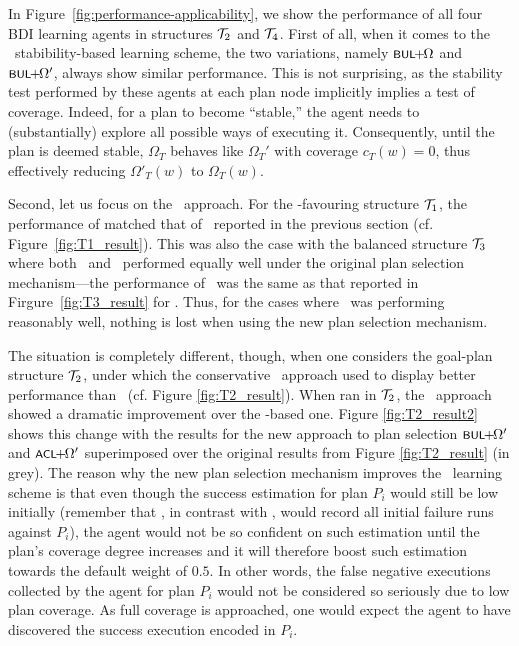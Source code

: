 In Figure~\ref{fig:performance-applicability}, we show the performance of all
four BDI learning agents in structures ${\mathcal{T}}_2$ and ${\mathcal{T}}_4$.
First of all, when it comes to the \BUL\ stabibility-based learning scheme, the
two variations, namely $\BULSELA$ and $\BULSELB$, always show similar
performance.
This is not surprising, as the stability test performed by these agents at each
plan node implicitly implies a test of coverage. Indeed, for a plan to become
``stable,'' the agent needs to (substantially) explore all possible  ways of
executing it. Consequently,  until the plan is deemed stable, $\Omega_T$ behaves
like $\Omega_T'$ with coverage $c_T(w)=0$, thus effectively reducing
$\Omega'_T(w)$ to $\Omega_T(w)$.



Second, let us focus on the \CL\ approach.
For the \CL-favouring structure ${\mathcal{T}}_1$, the performance of \CLSELB matched that
of \CLSELA\ reported in the previous section (cf. Figure~\ref{fig:T1_result}).
This was also the case with the balanced structure ${\mathcal{T}}_3$ where both \CL\ and
\BUL\ performed equally well under the original plan selection mechanism---the
performance of \CLSELB\ was the same as that reported in
Firgure~\ref{fig:T3_result} for \CLSELA.
Thus, for the cases where \CL\ was performing reasonably well, nothing is lost
when using the new plan selection mechanism.



The situation is completely different, though, when one considers the goal-plan
structure ${\mathcal{T}}_2$, under which the conservative \BULSELA\ approach used to display
better performance than \CLSELA\ (cf. Figure \ref{fig:T2_result}).
When ran in ${\mathcal{T}}_2$, the \CLSELB\ approach showed a dramatic improvement over the
\CLSELA-based one. Figure \ref{fig:T2_result2} shows this change with the results
for the new approach to plan selection $\BULSELB$ and $\CLSELB$ superimposed over
the original results from Figure \ref{fig:T2_result} (in grey).
The reason why the new plan selection mechanism improves the \CL\ learning scheme
is that even though the success estimation for plan $P_i$ would still be low
initially (remember that \CL, in contrast with \BUL, would record all initial
failure runs against $P_i$), the agent would not be so confident on such
estimation until the plan's coverage degree increases and it will therefore boost
such estimation towards the default weight of $0.5$. In other words, the false
negative executions collected by the agent for plan $P_i$ would not be
considered so seriously due to low plan coverage. As full coverage is
approached, one would expect the agent to have discovered the success execution
encoded in $P_i$.



